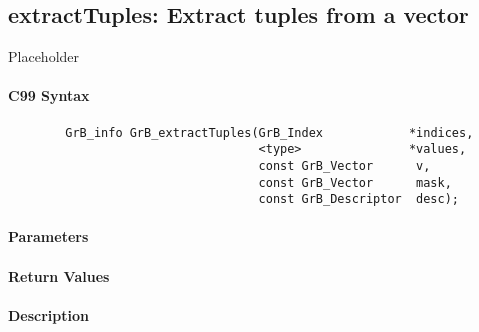 \subsection{{\sf extractTuples}: Extract tuples from a vector}
\label{Sec:extractTuples}

Placeholder


\paragraph{C99 Syntax}

\begin{verbatim}
        GrB_info GrB_extractTuples(GrB_Index            *indices,
                                   <type>               *values, 
                                   const GrB_Vector      v,
                                   const GrB_Vector      mask,
                                   const GrB_Descriptor  desc);
\end{verbatim}

\paragraph{Parameters}

\paragraph{Return Values}
%
\paragraph{Description}
